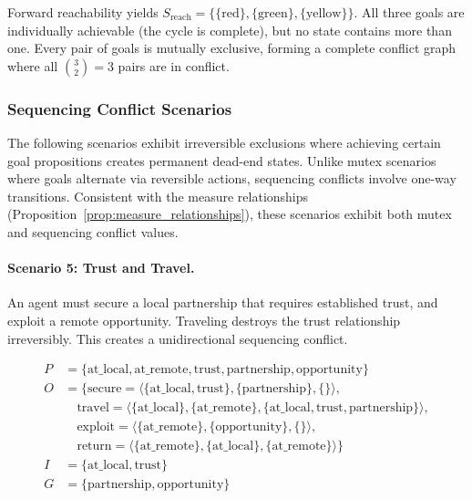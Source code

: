 Forward reachability yields $S_{\text{reach}} = \{\{\text{red}\}, \{\text{green}\}, \{\text{yellow}\}\}$. All three goals are individually achievable (the cycle is complete), but no state contains more than one. Every pair of goals is mutually exclusive, forming a complete conflict graph where all $\binom{3}{2} = 3$ pairs are in conflict.

\subsubsection{Sequencing Conflict Scenarios}

The following scenarios exhibit irreversible exclusions where achieving certain goal propositions creates permanent dead-end states. Unlike mutex scenarios where goals alternate via reversible actions, sequencing conflicts involve one-way transitions. Consistent with the measure relationships (Proposition~\ref{prop:measure_relationships}), these scenarios exhibit both mutex and sequencing conflict values.

\paragraph{Scenario 5: Trust and Travel.}

An agent must secure a local partnership that requires established trust, and exploit a remote opportunity. Traveling destroys the trust relationship irreversibly. This creates a unidirectional sequencing conflict.

\begin{align*}
  P & = \{\text{at\_local}, \text{at\_remote}, \text{trust}, \text{partnership}, \text{opportunity}\}                                            \\
  O & = \{ \text{secure} = \langle \{\text{at\_local}, \text{trust}\}, \{\text{partnership}\}, \{\} \rangle,                                     \\
    & \quad \text{travel} = \langle \{\text{at\_local}\}, \{\text{at\_remote}\}, \{\text{at\_local}, \text{trust}, \text{partnership}\} \rangle, \\
    & \quad \text{exploit} = \langle \{\text{at\_remote}\}, \{\text{opportunity}\}, \{\} \rangle,                                                \\
    & \quad \text{return} = \langle \{\text{at\_remote}\}, \{\text{at\_local}\}, \{\text{at\_remote}\} \rangle \}                                \\
  I & = \{\text{at\_local}, \text{trust}\}                                                                                                       \\
  G & = \{\text{partnership}, \text{opportunity}\}
\end{align*}

